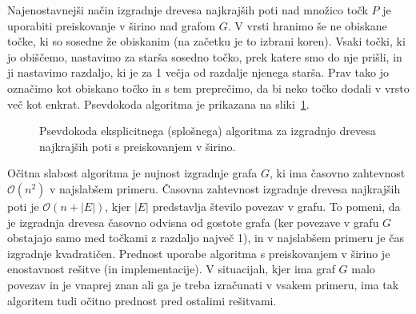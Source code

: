 \documentclass[a4paper, 12pt]{book}
\newcommand{\OO}{\ensuremath{\mathcal{O}}} %
\begin{document}
Najenostavnejši način izgradnje drevesa najkrajših poti nad množico točk $P$ je uporabiti preiskovanje v širino nad grafom $G$. V vrsti hranimo še ne obiskane točke, ki so sosedne že obiskanim (na začetku je to izbrani koren). Vsaki točki, ki jo obiščemo, nastavimo za starša sosedno točko, prek katere smo do nje prišli, in ji nastavimo razdaljo, ki je za 1 večja od razdalje njenega starša. Prav tako jo označimo kot obiskano točko in s tem preprečimo, da bi neko točko dodali v vrsto več kot enkrat. Psevdokoda algoritma je prikazana na sliki~\ref{fig:genericBfs}. 
\begin{figure}[htp]
\begin{center}
\end{center}
\caption{Psevdokoda eksplicitnega (splošnega) algoritma za izgradnjo drevesa najkrajših poti s preiskovanjem v širino.}
\label{fig:genericBfs}
\end{figure}
Očitna slabost algoritma je nujnost izgradnje grafa $G$, ki ima časovno zahtevnost $\OO(n^2)$ v najslabšem primeru. Časovna zahtevnost izgradnje drevesa najkrajših poti je $\OO(n + |E|)$, kjer $|E|$ predstavlja število povezav v grafu. To pomeni, da je izgradnja drevesa časovno odvisna od gostote grafa (ker povezave v grafu $G$ obstajajo samo med točkami z razdaljo največ 1), in v najslabšem primeru je čas izgradnje kvadratičen. Prednost uporabe algoritma s preiskovanjem v širino je enostavnost rešitve (in implementacije). V situacijah, kjer ima graf $G$ malo povezav in je vnaprej znan ali ga je treba izračunati v vsakem primeru, ima tak algoritem tudi očitno prednost pred ostalimi rešitvami. 
\end{document}

